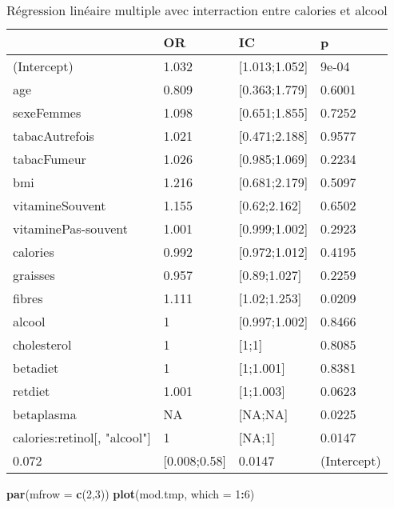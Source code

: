 \documentclass[]{article}
\newenvironment{Shaded}{\begin{snugshade}}{\end{snugshade}}
\newcommand{\KeywordTok}[1]{\textcolor[rgb]{0.13,0.29,0.53}{\textbf{#1}}}
\newcommand{\DataTypeTok}[1]{\textcolor[rgb]{0.13,0.29,0.53}{#1}}
\newcommand{\DecValTok}[1]{\textcolor[rgb]{0.00,0.00,0.81}{#1}}
\newcommand{\OperatorTok}[1]{\textcolor[rgb]{0.81,0.36,0.00}{\textbf{#1}}}
\newcommand{\NormalTok}[1]{#1}
\begin{document}
\begin{table}

\caption{\label{tab:unnamed-chunk-88}Régression linéaire multiple avec interraction entre calories et alcool}
\centering
\begin{tabular}[t]{l|l|l|l}
\hline
  & OR & IC & p\\
\hline
\rowcolor[HTML]{BBD2E1}  (Intercept) & 1.032 & [1.013;1.052] & 9e-04\\
\hline
age & 0.809 & [0.363;1.779] & 0.6001\\
\hline
\rowcolor[HTML]{BBD2E1}  sexeFemmes & 1.098 & [0.651;1.855] & 0.7252\\
\hline
tabacAutrefois & 1.021 & [0.471;2.188] & 0.9577\\
\hline
\rowcolor[HTML]{BBD2E1}  tabacFumeur & 1.026 & [0.985;1.069] & 0.2234\\
\hline
bmi & 1.216 & [0.681;2.179] & 0.5097\\
\hline
\rowcolor[HTML]{BBD2E1}  vitamineSouvent & 1.155 & [0.62;2.162] & 0.6502\\
\hline
vitaminePas-souvent & 1.001 & [0.999;1.002] & 0.2923\\
\hline
\rowcolor[HTML]{BBD2E1}  calories & 0.992 & [0.972;1.012] & 0.4195\\
\hline
graisses & 0.957 & [0.89;1.027] & 0.2259\\
\hline
\rowcolor[HTML]{BBD2E1}  fibres & 1.111 & [1.02;1.253] & 0.0209\\
\hline
alcool & 1 & [0.997;1.002] & 0.8466\\
\hline
\rowcolor[HTML]{BBD2E1}  cholesterol & 1 & [1;1] & 0.8085\\
\hline
betadiet & 1 & [1;1.001] & 0.8381\\
\hline
\rowcolor[HTML]{BBD2E1}  retdiet & 1.001 & [1;1.003] & 0.0623\\
\hline
betaplasma & NA & [NA;NA] & 0.0225\\
\hline
\rowcolor[HTML]{BBD2E1}  calories:retinol[, "alcool"] & 1 & [NA;1] & 0.0147\\
\hline
0.072 & [0.008;0.58] & 0.0147 & (Intercept)\\
\hline
\end{tabular}
\end{table}

\begin{Shaded}
\begin{Highlighting}[]
\KeywordTok{par}\NormalTok{(}\DataTypeTok{mfrow =} \KeywordTok{c}\NormalTok{(}\DecValTok{2}\NormalTok{,}\DecValTok{3}\NormalTok{))}
\KeywordTok{plot}\NormalTok{(mod.tmp, }\DataTypeTok{which =} \DecValTok{1}\OperatorTok{:}\DecValTok{6}\NormalTok{)}
\end{Highlighting}
\end{Shaded}
\end{document}
